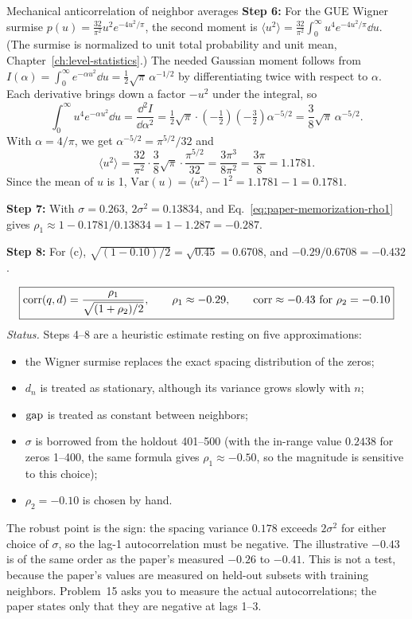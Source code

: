 \begin{sample}{Mechanical anticorrelation of neighbor averages}
\textbf{Step 6:} For the GUE Wigner surmise $p(u)=\frac{32}{\pi^2}u^2e^{-4u^2/\pi}$, the second moment is $\langle u^2\rangle=\frac{32}{\pi^2}\int_0^\infty u^4e^{-4u^2/\pi}\dd u$. (The surmise is normalized to unit total probability and unit mean, Chapter~\ref{ch:level-statistics}.) The needed Gaussian moment follows from $I(\alpha)=\int_0^\infty e^{-\alpha u^2}\dd u=\tfrac12\sqrt\pi\,\alpha^{-1/2}$ by differentiating twice with respect to $\alpha$. Each derivative brings down a factor $-u^2$ under the integral, so
\[
\int_0^\infty u^4e^{-\alpha u^2}\dd u=\frac{\dd^2I}{\dd\alpha^2}=\tfrac12\sqrt\pi\cdot\left(-\tfrac12\right)\left(-\tfrac32\right)\alpha^{-5/2}=\frac38\sqrt\pi\,\alpha^{-5/2}.
\]
With $\alpha=4/\pi$, we get $\alpha^{-5/2}=\pi^{5/2}/32$ and
\[
\langle u^2\rangle=\frac{32}{\pi^2}\cdot\frac38\sqrt\pi\cdot\frac{\pi^{5/2}}{32}=\frac{3\pi^3}{8\pi^2}=\frac{3\pi}{8}=1.1781 .
\]
Since the mean of $u$ is 1, $\mathrm{Var}(u)=\langle u^2\rangle-1^2=1.1781-1=0.1781$.

\textbf{Step 7:} With $\sigma=0.263$, $2\sigma^2=0.13834$, and Eq.~\eqref{eq:paper-memorization-rho1} gives $\rho_1\approx1-0.1781/0.13834=1-1.287=-0.287$.

\textbf{Step 8:} For (c), $\sqrt{(1-0.10)/2}=\sqrt{0.45}=0.6708$, and $-0.29/0.6708=-0.432$.

\[
\boxed{\corr(q,d)=\frac{\rho_1}{\sqrt{(1+\rho_2)/2}},\qquad \rho_1\approx-0.29,\qquad \corr\approx-0.43\ \text{for}\ \rho_2=-0.10}
\]
\emph{Status.} Steps 4--8 are a heuristic estimate resting on five approximations:
\begin{itemize}
\item the Wigner surmise replaces the exact spacing distribution of the zeros;
\item $d_n$ is treated as stationary, although its variance grows slowly with $n$;
\item $\mathrm{gap}$ is treated as constant between neighbors;
\item $\sigma$ is borrowed from the holdout 401--500 (with the in-range value $0.2438$ for zeros 1--400, the same formula gives $\rho_1\approx-0.50$, so the magnitude is sensitive to this choice);
\item $\rho_2=-0.10$ is chosen by hand.
\end{itemize}
The robust point is the sign: the spacing variance $0.178$ exceeds $2\sigma^2$ for either choice of $\sigma$, so the lag-1 autocorrelation must be negative. The illustrative $-0.43$ is of the same order as the paper's measured $-0.26$ to $-0.41$. This is not a test, because the paper's values are measured on held-out subsets with training neighbors. Problem~15 asks you to measure the actual autocorrelations; the paper states only that they are negative at lags 1--3.
\end{sample}

